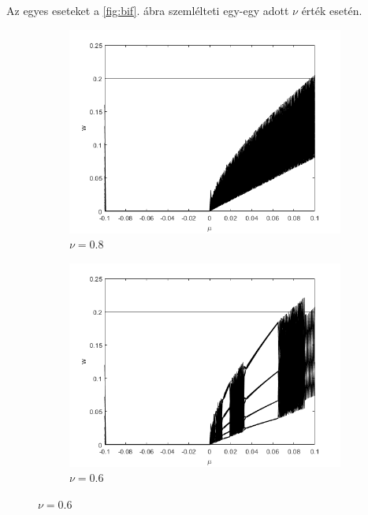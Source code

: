 Az egyes eseteket a \ref{fig:bif}. ábra szemlélteti egy-egy adott $\nu$ érték esetén.

\begin{figure}[ht!]
\centering
\begin{subfigure}[b]{0.45\linewidth}
         \centering
         \includegraphics[width=1\linewidth]{graphics/bif_08.png}
         \caption{$\nu=0.8$}
         \label{fig:kis_csillapitas}
     \end{subfigure}
     \begin{subfigure}[b]{0.45\linewidth}
         \centering
         \includegraphics[width=1\linewidth]{graphics/bif_06.png}
         \caption{$\nu=0.6$}
         \label{fig:kozepes_csillapitas}
     \end{subfigure}

\end{figure}
